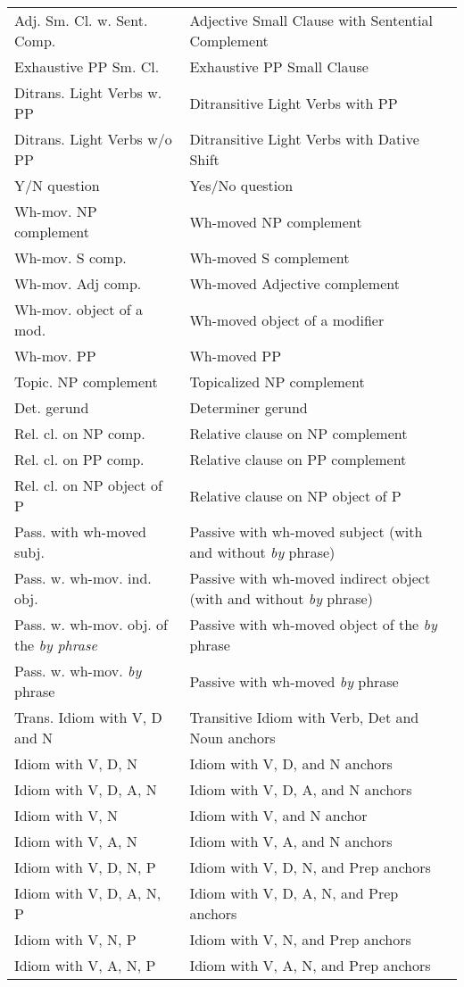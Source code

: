 \begin{tabular}{ll}
Adj. Sm. Cl. w. Sent. Comp.&Adjective Small Clause with Sentential 
Complement\\ 
Exhaustive PP Sm. Cl.&Exhaustive PP Small Clause\\ 
Ditrans. Light Verbs w. PP&Ditransitive Light Verbs with PP\\ 
Ditrans. Light Verbs w/o PP&Ditransitive Light Verbs with Dative Shift\\ 
Y/N question&Yes/No question \\ 
Wh-mov. NP complement&Wh-moved NP complement \\ 
Wh-mov. S comp.&Wh-moved S complement \\ 
Wh-mov. Adj comp.&Wh-moved Adjective complement \\ 
Wh-mov. object of a mod.&Wh-moved object of a modifier \\ 
Wh-mov. PP&Wh-moved PP \\ 
Topic. NP complement&Topicalized NP complement \\ 
Det. gerund&Determiner gerund \\ 
Rel. cl. on NP comp.&Relative clause on NP complement \\ 
Rel. cl. on PP comp.& Relative clause on PP complement\\ 
Rel. cl. on NP object of P& Relative clause on NP object of P\\ 
Pass. with wh-moved subj.&Passive with wh-moved subject (with and without {\it by} phrase) \\ 
Pass. w. wh-mov. ind. obj.&Passive with wh-moved indirect object (with and without {\it by} phrase) \\ 
Pass. w. wh-mov. obj. of the {\it {\it by} phrase}&Passive with wh-moved object of the {\it by} phrase \\ 
Pass. w. wh-mov. {\it by} phrase&Passive with wh-moved {\it by} phrase \\ 
Trans. Idiom with V, D and N & Transitive Idiom with Verb, Det and 
Noun anchors\\ 
Idiom with V, D, N & Idiom with V, D, and N anchors \\ 
Idiom with V, D, A, N & Idiom with V, D, A, and N anchors \\ 
Idiom with V, N & Idiom with V, and N anchor \\ 
Idiom with V, A, N & Idiom with V, A, and N anchors \\ 
Idiom with V, D, N, P & Idiom with V, D, N, and Prep anchors \\ 
Idiom with V, D, A, N, P & Idiom with V, D, A, N, and Prep anchors \\ 
Idiom with V, N, P & Idiom with V, N, and Prep anchors \\ 
Idiom with V, A, N, P & Idiom with V, A, N, and Prep anchors 
\end{tabular} 
\normalsize 
 
